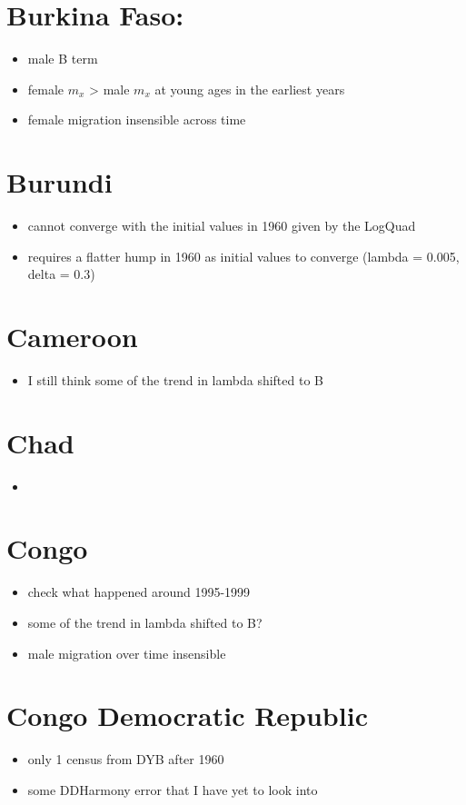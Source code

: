 \documentclass[12pt,a4paper]{article}
\begin{document}
\section*{Burkina Faso:}
\begin{itemize}
\item male B term
\item female $m_x$ > male $m_x$ at young ages in the earliest years
\item female migration insensible across time
\end{itemize}

\section*{Burundi}
\begin{itemize}
\item cannot converge with the initial values in 1960 given by the LogQuad
\item requires a flatter hump in 1960 as initial values to converge (lambda = 0.005, delta = 0.3)
\end{itemize}

\section*{Cameroon}
\begin{itemize}
\item I still think some of the trend in lambda shifted to B
\end{itemize}

\section*{Chad}
\begin{itemize}
\item 
\end{itemize}

\section*{Congo}
\begin{itemize}
\item check what happened around 1995-1999
\item some of the trend in lambda shifted to B?
\item male migration over time insensible
\end{itemize}

\section*{Congo Democratic Republic}
\begin{itemize}
\item only 1 census from DYB after 1960
\item some DDHarmony error that I have yet to look into
\end{itemize}
\end{document}

